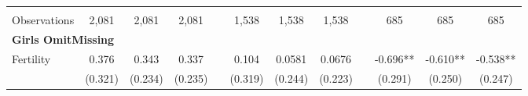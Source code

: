 \begin{landscape}
\begin{table}[htpb!]
\begin{center}
\begin{tabular}{lcccp{2mm}cccp{2mm}ccc}
\begin{footnotesize}\end{footnotesize}&\begin{footnotesize}\end{footnotesize}&\begin{footnotesize}\end{footnotesize}&\begin{footnotesize}\end{footnotesize}&\begin{footnotesize}\end{footnotesize}&\begin{footnotesize}\end{footnotesize}&\begin{footnotesize}\end{footnotesize}&\begin{footnotesize}\end{footnotesize}&\begin{footnotesize}\end{footnotesize}&\begin{footnotesize}\end{footnotesize}&\begin{footnotesize}\end{footnotesize}&\begin{footnotesize}\end{footnotesize}\\Observations&2,081&2,081&2,081&&1,538&1,538&1,538&&685&685&685\\
\multicolumn{12}{l}{\textbf{Girls OmitMissing}}\\ 
Fertility&0.376&0.343&0.337&&0.104&0.0581&0.0676&&-0.696**&-0.610**&-0.538**\\
&(0.321)&(0.234)&(0.235)&&(0.319)&(0.244)&(0.223)&&(0.291)&(0.250)&(0.247)\\

\end{tabular}
\end{center}
\end{table}
\end{landscape}

